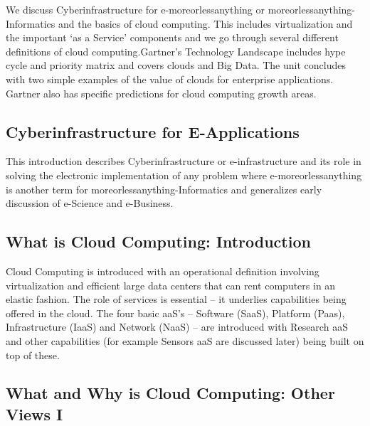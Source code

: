 We discuss Cyberinfrastructure for e-moreorlessanything or
moreorlessanything-Informatics and the basics of cloud computing. This
includes virtualization and the important `as a Service' components and
we go through several different definitions of cloud computing.Gartner's
Technology Landscape includes hype cycle and priority matrix and covers
clouds and Big Data. The unit concludes with two simple examples of the
value of clouds for enterprise applications. Gartner also has specific
predictions for cloud computing growth areas.


\subsection{Cyberinfrastructure for E-Applications}

This introduction describes Cyberinfrastructure or e-infrastructure and
its role in solving the electronic implementation of any problem where
e-moreorlessanything is another term for moreorlessanything-Informatics
and generalizes early discussion of e-Science and e-Business.


\subsection{What is Cloud Computing: Introduction}

Cloud Computing is introduced with an operational definition involving
virtualization and efficient large data centers that can rent computers
in an elastic fashion. The role of services is essential -- it underlies
capabilities being offered in the cloud. The four basic aaS's --
Software (SaaS), Platform (Paas), Infrastructure (IaaS) and Network
(NaaS) -- are introduced with Research aaS and other capabilities (for
example Sensors aaS are discussed later) being built on top of these.


\subsection{What and Why is Cloud Computing: Other Views I}

